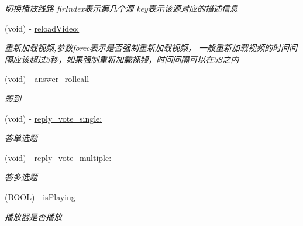 \begin{DoxyCompactItemize}
\begin{DoxyCompactList}\small\item\em 切换播放线路 fir\+Index表示第几个源 key表示该源对应的描述信息 \end{DoxyCompactList}\item 
\mbox{\label{interface_request_data_acbe1b2db40350e4f5fb4e714e3303ccd}} 
(void) -\/ \hyperlink{interface_request_data_acbe1b2db40350e4f5fb4e714e3303ccd}{reload\+Video\+:}
\begin{DoxyCompactList}\small\item\em 重新加载视频,参数force表示是否强制重新加载视频， 一般重新加载视频的时间间隔应该超过3秒，如果强制重新加载视频，时间间隔可以在3\+S之内 \end{DoxyCompactList}\item 
\mbox{\label{interface_request_data_a0111d63c6e3a42932722a36a673c8645}} 
(void) -\/ \hyperlink{interface_request_data_a0111d63c6e3a42932722a36a673c8645}{answer\+\_\+rollcall}
\begin{DoxyCompactList}\small\item\em 签到 \end{DoxyCompactList}\item 
\mbox{\label{interface_request_data_a78dbd275a2d087ae7528ba0550891623}} 
(void) -\/ \hyperlink{interface_request_data_a78dbd275a2d087ae7528ba0550891623}{reply\+\_\+vote\+\_\+single\+:}
\begin{DoxyCompactList}\small\item\em 答单选题 \end{DoxyCompactList}\item 
\mbox{\label{interface_request_data_afbac7a33f1e2f07f1e5e53bbfc9e829d}} 
(void) -\/ \hyperlink{interface_request_data_afbac7a33f1e2f07f1e5e53bbfc9e829d}{reply\+\_\+vote\+\_\+multiple\+:}
\begin{DoxyCompactList}\small\item\em 答多选题 \end{DoxyCompactList}\item 
\mbox{\label{interface_request_data_acbef681a6e74e8eb85c9f4c3725eac49}} 
(B\+O\+OL) -\/ \hyperlink{interface_request_data_acbef681a6e74e8eb85c9f4c3725eac49}{is\+Playing}
\begin{DoxyCompactList}\small\item\em 播放器是否播放 \end{DoxyCompactList}\item 

\end{DoxyCompactItemize}
